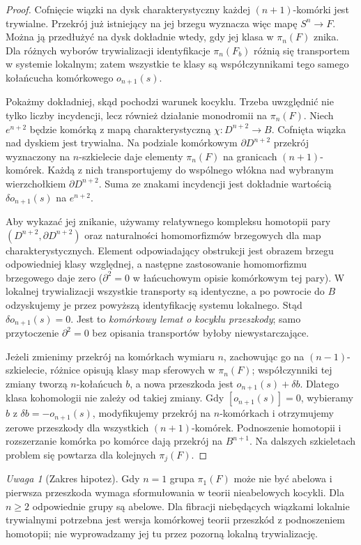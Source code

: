 \documentclass[11pt,a4paper,oneside]{report}
\theoremstyle{plain}
\theoremstyle{definition}
\theoremstyle{remark}
\newtheorem{uwaga}[twierdzenie]{Uwaga}
\begin{document}
\begin{proof}
Cofnięcie wiązki na dysk charakterystyczny każdej
$(n+1)$-komórki jest trywialne. Przekrój już istniejący
na jej brzegu wyznacza więc mapę $S^n\to F$.
Można ją przedłużyć na dysk dokładnie wtedy, gdy
jej klasa w $\pi_n(F)$ znika.
Dla różnych wyborów trywializacji identyfikacje
$\pi_n(F_b)$ różnią się transportem w systemie lokalnym;
zatem wszystkie te klasy są współczynnikami tego samego
kołańcucha komórkowego $o_{n+1}(s)$.

Pokażmy dokładniej, skąd pochodzi warunek kocyklu.
Trzeba uwzględnić nie tylko liczby incydencji,
lecz również działanie monodromii na $\pi_n(F)$.
Niech $e^{n+2}$ będzie komórką z mapą
charakterystyczną $\chi:D^{n+2}\to B$.
Cofnięta wiązka nad dyskiem jest trywialna.
Na podziale komórkowym $\partial D^{n+2}$ przekrój
wyznaczony na $n$-szkielecie daje elementy
$\pi_n(F)$ na granicach $(n+1)$-komórek.
Każdą z nich transportujemy do wspólnego włókna
nad wybranym wierzchołkiem $\partial D^{n+2}$.
Suma ze znakami incydencji jest dokładnie wartością
$\delta o_{n+1}(s)$ na $e^{n+2}$.

Aby wykazać jej znikanie, używamy relatywnego
kompleksu homotopii pary
$(D^{n+2},\partial D^{n+2})$ oraz naturalności
homomorfizmów brzegowych dla map charakterystycznych.
Element odpowiadający obstrukcji jest obrazem
brzegu odpowiedniej klasy względnej, a następne
zastosowanie homomorfizmu brzegowego daje zero
($\partial^2=0$ w łańcuchowym opisie komórkowym
tej pary). W lokalnej trywializacji wszystkie
transporty są identyczne, a po powrocie do $B$
odzyskujemy je przez powyższą identyfikację systemu
lokalnego. Stąd $\delta o_{n+1}(s)=0$.
Jest to \emph{komórkowy lemat o kocyklu przeszkody};
samo przytoczenie $\partial^2=0$ bez opisania
transportów byłoby niewystarczające.

Jeżeli zmienimy przekrój na komórkach wymiaru $n$,
zachowując go na $(n-1)$-szkielecie, różnice
opisują klasy map sferowych w $\pi_n(F)$; współczynniki
tej zmiany tworzą $n$-kołańcuch $b$, a nowa przeszkoda jest
$o_{n+1}(s)+\delta b$. Dlatego klasa kohomologii
nie zależy od takiej zmiany. Gdy $[o_{n+1}(s)]=0$,
wybieramy $b$ z $\delta b=-o_{n+1}(s)$,
modyfikujemy przekrój na $n$-komórkach i otrzymujemy
zerowe przeszkody dla wszystkich $(n+1)$-komórek.
Podnoszenie homotopii i rozszerzanie komórka po komórce
dają przekrój na $B^{n+1}$. Na dalszych szkieletach
problem się powtarza dla kolejnych $\pi_j(F)$.
\end{proof}

\begin{uwaga}[Zakres hipotez]
Gdy $n=1$ grupa $\pi_1(F)$ może nie być abelowa i
pierwsza przeszkoda wymaga sformułowania w teorii
nieabelowych kocykli. Dla $n\ge2$ odpowiednie grupy
są abelowe. Dla fibracji niebędących wiązkami lokalnie
trywialnymi potrzebna jest wersja komórkowej teorii
przeszkód z podnoszeniem homotopii; nie wyprowadzamy
jej tu przez pozorną lokalną trywializację.
\end{uwaga}
\end{document}

